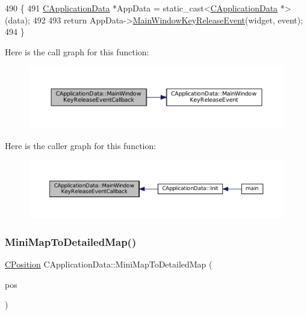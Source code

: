 \begin{DoxyCode}
490                                                                                                            
           \{
491     \hyperlink{classCApplicationData}{CApplicationData} *AppData = \textcolor{keyword}{static\_cast<}\hyperlink{classCApplicationData}{CApplicationData} *\textcolor{keyword}{>}(data);
492 
493     \textcolor{keywordflow}{return} AppData->\hyperlink{classCApplicationData_aff9f46bccd458a0dcca968e4a46c7d9b}{MainWindowKeyReleaseEvent}(widget, event);
494 \}
\end{DoxyCode}
Here is the call graph for this function\+:
\nopagebreak
\begin{figure}[H]
\begin{center}
\leavevmode
\includegraphics[width=350pt]{classCApplicationData_a4b2c76db5c2efd75404502e36700f99b_cgraph}
\end{center}
\end{figure}
Here is the caller graph for this function\+:
\nopagebreak
\begin{figure}[H]
\begin{center}
\leavevmode
\includegraphics[width=350pt]{classCApplicationData_a4b2c76db5c2efd75404502e36700f99b_icgraph}
\end{center}
\end{figure}
\hypertarget{classCApplicationData_a3dabde94ddec0eb2c732525f54164bc5}{}\label{classCApplicationData_a3dabde94ddec0eb2c732525f54164bc5} 
\subsubsection{\texorpdfstring{Mini\+Map\+To\+Detailed\+Map()}{MiniMapToDetailedMap()}}
{\footnotesize\ttfamily \hyperlink{classCPosition}{C\+Position} C\+Application\+Data\+::\+Mini\+Map\+To\+Detailed\+Map (\begin{DoxyParamCaption}\item[{const \hyperlink{classCPosition}{C\+Position} \&}]{pos }\end{DoxyParamCaption})\hspace{0.3cm}{\ttfamily [protected]}}



